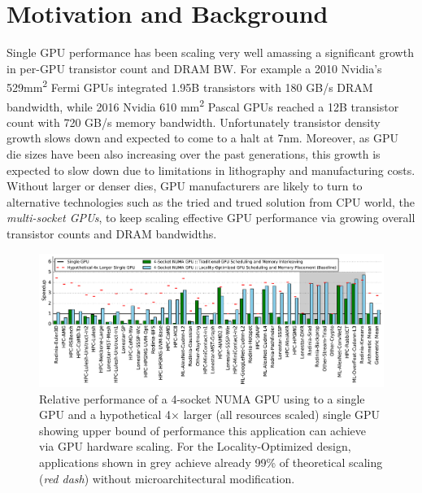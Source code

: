 \section{Motivation and Background}
\label{background}

Single GPU performance has been scaling very well amassing a significant
growth in per-GPU transistor count and DRAM BW. For example a 2010 Nvidia's
529mm\textsuperscript{2} Fermi GPUs integrated 1.95B transistors with 180 GB/s
DRAM bandwidth, while 2016 Nvidia 610 mm\textsuperscript{2} Pascal GPUs reached
a 12B transistor count with 720 GB/s memory bandwidth. Unfortunately transistor density
growth slows down and expected to come to a halt at 7nm. Moreover, as GPU die sizes
have been also increasing over the past generations, this growth is expected to
slow down due to limitations in lithography and manufacturing costs. 
Without larger or denser dies, GPU manufacturers are likely to turn to 
alternative technologies such as the tried and trued solution from CPU world,
the \textit{multi-socket GPUs}, to keep scaling effective GPU performance via 
growing overall transistor counts and DRAM bandwidths. 


\begin{figure}[tp] 
    \centering
    \includegraphics[width=1.0\linewidth]{figures/plot_different_baselines.pdf}
    \caption{Relative performance of a 4-socket NUMA GPU using to a single GPU 
and a hypothetical 4$\times$ larger (all resources scaled) single GPU showing 
upper bound of performance this application can achieve via GPU hardware 
scaling. For the Locality-Optimized design, applications shown in grey 
achieve already 99\% of theoretical scaling (\emph{red dash}) without 
microarchitectural modification.}
    \label{fig:motivation}
\end{figure}

